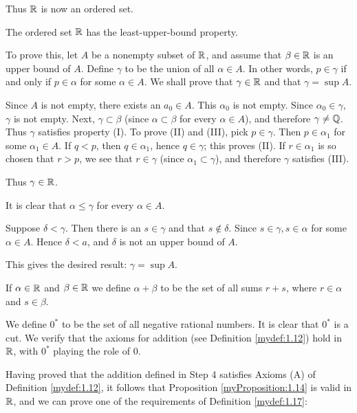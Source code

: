 Thus ${\protect\mathbb R}$ is now an ordered set.


\label{chap01_app_Step:3}
The ordered set ${\protect\mathbb R}$ has the least-upper-bound property.

To prove this, let $A$ be a nonempty subset of ${\protect\mathbb R}$,
and assume that $\beta \in {\protect\mathbb R}$ is an upper bound of $A$.
Define $\gamma$ to be the union of all $\alpha \in A$.
In other words, $p \in \gamma$ if and only if $p \in \alpha$ for some $\alpha \in A$.
We shall prove that $\gamma \in {\protect\mathbb R}$ and that $\gamma = \sup A$.

Since $A$ is not empty, there exists an $a_0 \in A$.
This $\alpha_0$ is not empty.
Since $\alpha_0 \in \gamma$, $\gamma$ is not empty.
Next, $\gamma \subset \beta$
(since $\alpha \subset \beta$ for every $\alpha \in A$),
and therefore $\gamma \neq {\protect\mathbb Q}$.
Thus $\gamma$ satisfies property (I).
To prove (II) and (III), pick $p \in \gamma$.
Then $p \in \alpha_1$ for some $\alpha_1 \in A$.
If $q <p$, then $q \in \alpha_1$, hence $q \in \gamma$; this proves (II).
If $r \in \alpha_1$ is so chosen that $r > p$,
we see that $r\in \gamma$ (since $\alpha_1 \subset \gamma$),
and therefore $\gamma$ satisfies (III).

Thus $\gamma \in {\protect\mathbb R}$.

It is clear that $\alpha \leq \gamma$ for every $\alpha \in A$.

Suppose $\delta < \gamma$.
Then there is an $s \in \gamma$ and that $s \not\in \delta$.
Since $s \in \gamma, s \in \alpha$ for some $\alpha \in A$.
Hence $\delta <a$, and $\delta$ is not an upper bound of $A$.

This gives the desired result: $\gamma = \sup A$.


\label{chap01_app_Step:4}
If $\alpha \in {\protect\mathbb R}$ and $\beta \in {\protect\mathbb R}$
we define $\alpha + \beta$ to be the set of all sums $r + s$,
where $r \in \alpha$ and $s \in \beta$.

We define $0^*$ to be the set of all negative rational numbers.
It is clear that $0^*$ is a cut.
We verify that the axioms for addition
(see Definition \ref{mydef:1.12})
hold in ${\protect\mathbb R}$, with $0^*$ playing the role of $0$.

\label{chap01_app_Step:5}
Having proved that the addition defined in Step 4 satisfies Axioms (A) of Definition \ref{mydef:1.12},
it follows that Proposition \ref{myProposition:1.14} is valid in ${\protect\mathbb R}$, and we can
prove one of the requirements of Definition \ref{mydef:1.17}:

